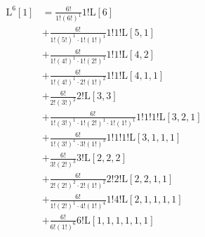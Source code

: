 \begin{equation*} \begin{aligned}
  \mathrm{L}^6[1] &=
  \frac{6!}{1!(6!)^1}
  1! \mathrm{L}[6] \\ &
+ \frac{6!}{1!(5!)^1 \cdot 1!(1!)^1}
  1!1! \mathrm{L}[5, 1] \\ &
+ \frac{6!}{1!(4!)^1 \cdot 1!(2!)^1}
  1!1! \mathrm{L}[4, 2] \\ &
+ \frac{6!}{1!(4!)^1 \cdot 2!(1!)^2}
  1!1! \mathrm{L}[4, 1, 1] \\ &
+ \frac{6!}{2!(3!)^2}
  2! \mathrm{L}[3, 3] \\ &
+ \frac{6!}{1!(3!)^1 \cdot 1!(2!)^1 \cdot 1!(1!)^1}
  1!1!1! \mathrm{L}[3, 2, 1] \\ &
+ \frac{6!}{1!(3!)^1 \cdot 3!(1!)^3}
  1!1!1! \mathrm{L}[3, 1, 1, 1] \\ &
+ \frac{6!}{3!(2!)^3}
  3! \mathrm{L}[2, 2, 2] \\ &
+ \frac{6!}{2!(2!)^2 \cdot 2!(1!)^2}
  2!2! \mathrm{L}[2, 2, 1, 1] \\ &
+ \frac{6!}{1!(2!)^1 \cdot 4!(1!)^4}
  1!4! \mathrm{L}[2, 1, 1, 1, 1] \\ &
+ \frac{6!}{6!(1!)^6}
  6! \mathrm{L}[1, 1, 1, 1, 1, 1] \\
\end{aligned} \end{equation*}